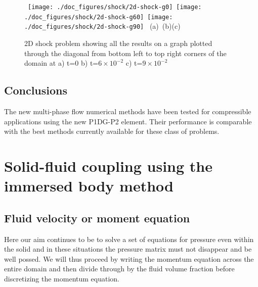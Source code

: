 \begin{figure}[H]
\vbox{
\hbox{
\hspace{-1.cm}
\texttt{[image: ./doc\_figures/shock/2d-shock-g0]}
\hspace{-1.cm}
\texttt{[image: ./doc\_figures/shock/2d-shock-g60]}
\hspace{-1.cm}
\texttt{[image: ./doc\_figures/shock/2d-shock-g90]}
}
\vspace{-0.cm}
\hbox{\hspace{4.cm}(a) \hspace{4.5cm}(b)\hspace{4.5cm}(c)}
\vspace{-0.cm}}
\label{2d-graphs}
\caption{ 2D shock problem showing all the results on a 
graph plotted through the diagonal from bottom left to top right 
corners of the domain at a) 
t=0 b) t=$6\times 10^{-2}$ c) t=$9\times 10^{-2}$ }
\end{figure}






\subsection{Conclusions} 
The new multi-phase flow numerical methods have been 
tested for compressible applications using the 
new P1DG-P2 element. Their performance 
is comparable with the best methods currently available 
for these class of problems. 









\vfill\eject



\section{Solid-fluid coupling using the immersed body method} 



\subsection{Fluid velocity or moment equation} 
Here our aim continues to be to solve a set of equations 
for pressure even within the solid and in these situations 
the pressure matrix must not disappear and be well possed. 
We will thus proceed by writing the momentum equation 
across the entire domain and then divide through by the 
fluid volume fraction before discretizing the momentum equation. 

